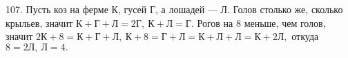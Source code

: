 107. Пусть коз на ферме К, гусей Г, а лошадей --- Л. Голов столько же, сколько крыльев, значит $\text{К}+\text{Г}+\text{Л}=2\text{Г},\ \text{К}+\text{Л}=\text{Г}.$ Рогов на 8 меньше, чем голов, значит $2\text{К}+8=\text{К}+\text{Г}+\text{Л},\ \text{К}+8=\text{Г}+\text{Л}=\text{К}+\text{Л}+\text{Л}=\text{К}+2\text{Л},$ откуда $8=2\text{Л},\ \text{Л}=4.$\\
